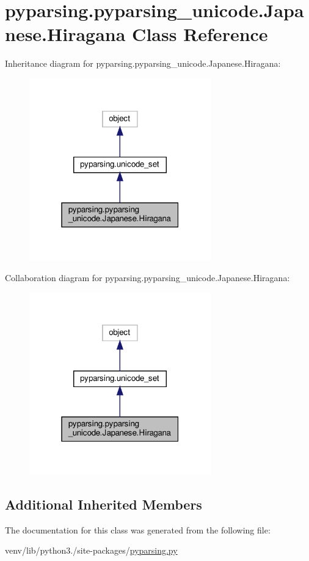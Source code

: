 \hypertarget{classpyparsing_1_1pyparsing__unicode_1_1Japanese_1_1Hiragana}{}\section{pyparsing.\+pyparsing\+\_\+unicode.\+Japanese.\+Hiragana Class Reference}
\label{classpyparsing_1_1pyparsing__unicode_1_1Japanese_1_1Hiragana}


Inheritance diagram for pyparsing.\+pyparsing\+\_\+unicode.\+Japanese.\+Hiragana\+:
\nopagebreak
\begin{figure}[H]
\begin{center}
\leavevmode
\includegraphics[width=223pt]{classpyparsing_1_1pyparsing__unicode_1_1Japanese_1_1Hiragana__inherit__graph}
\end{center}
\end{figure}


Collaboration diagram for pyparsing.\+pyparsing\+\_\+unicode.\+Japanese.\+Hiragana\+:
\nopagebreak
\begin{figure}[H]
\begin{center}
\leavevmode
\includegraphics[width=223pt]{classpyparsing_1_1pyparsing__unicode_1_1Japanese_1_1Hiragana__coll__graph}
\end{center}
\end{figure}
\subsection*{Additional Inherited Members}


The documentation for this class was generated from the following file\+:\begin{DoxyCompactItemize}
\item 
venv/lib/python3./site-\/packages/\hyperlink{pyparsing_8py}{pyparsing.\+py}\end{DoxyCompactItemize}

